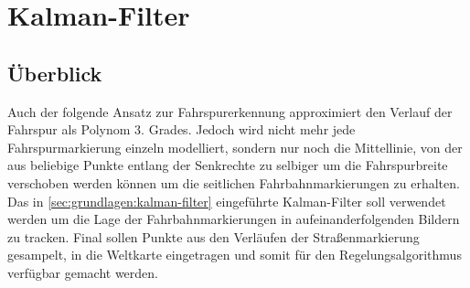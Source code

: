 \section{Kalman-Filter}

\subsection{Überblick} \label{ssec:fahrspurerkennung:kalman-filter:ueberblick}
Auch der folgende Ansatz zur Fahrspurerkennung approximiert den Verlauf der Fahrspur als Polynom 3. Grades. Jedoch wird nicht mehr jede Fahrspurmarkierung einzeln modelliert, sondern nur noch die Mittellinie, von der aus beliebige Punkte entlang der Senkrechte zu selbiger um die Fahrspurbreite verschoben werden können um die seitlichen Fahrbahnmarkierungen zu erhalten.
Das in \ref{sec:grundlagen:kalman-filter} eingeführte Kalman-Filter soll verwendet werden um die Lage der Fahrbahnmarkierungen in aufeinanderfolgenden Bildern zu tracken. Final sollen Punkte aus den Verläufen der Straßenmarkierung gesampelt, in die Weltkarte eingetragen und somit für den Regelungsalgorithmus verfügbar gemacht werden.

